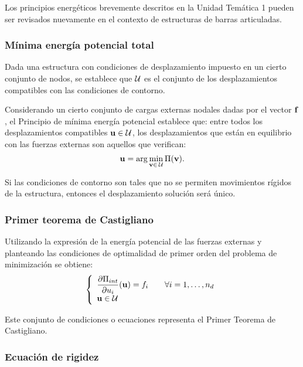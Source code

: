 Los principios energéticos brevemente descritos en la Unidad Temática 1 pueden ser revisados nuevamente en el contexto de estructuras de barras articuladas.


\subsubsection{Mínima energía potencial total}

Dada una estructura con condiciones de desplazamiento impuesto en un cierto conjunto de nodos, se establece que ${\mathcal U}$ es el conjunto de los desplazamientos compatibles con las condiciones de contorno. %
%


Considerando un cierto conjunto de cargas externas nodales dadas por el vector ${\bf f}$, el Principio de mínima energía potencial establece que: entre todos los desplazamientos compatibles ${\bf u} \in {\mathcal U}$, los desplazamientos que están en equilibrio con las fuerzas externas son aquellos que verifican:
%
\begin{equation}
{\bf u} = \arg\min_{{\bf v} \in \, {\mathcal U}} \Pi({\bf v}).
\end{equation}

Si las condiciones de contorno son tales que no se permiten movimientos rígidos de la estructura, entonces el desplazamiento solución será único.


\subsubsection{Primer teorema de Castigliano}

Utilizando la expresión de la energía potencial de las fuerzas externas y planteando las condiciones de optimalidad de primer orden del problema de minimización se obtiene:
%
\begin{equation}\label{eqn:castiguno}
\left\{ 
\begin{array}{l}
\displaystyle  \frac{\partial \Pi_{int} }{ \partial u_i}({\bf u}) = f_i \qquad \forall i=1,\dots, n_d\\
  {\bf u} \in {\mathcal U}
\end{array}
  \right.
\end{equation}

Este conjunto de condiciones o ecuaciones representa el Primer Teorema de Castigliano. %
%



\subsubsection{ Ecuación de rigidez }

